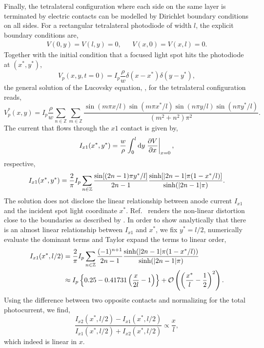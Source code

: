 Finally, the tetralateral configuration where each side on the same layer is terminated by electric contacts can be modelled by Dirichlet boundary conditions on all sides.
For a rectangular tetralateral photodiode of width $l$, the explicit boundary conditions are,
\begin{align}
	V(0, y)=V(l,y)=0, && V(x,0)=V(x,l)=0.
\end{align}
Together with the initial condition that a focused light spot hits the photodiode at $(x^*,y^*)$,
\begin{equation}
	V_p(x,y, t=0)=I_p\frac{\rho}{w}\delta(x-x^*)\delta(y-y^*)
	\label{eq:lucovsky_initial},
\end{equation}
the general solution of the Lucovsky equation, , for the tetralateral configuration reads,
\begin{equation}
	V^*_p(x,y)=I_p\frac{\rho}{w}\sum_{n\in\mathbb{Z}}\sum_{m\in\mathbb{Z}}\frac{\sin(m\pi x/l)\sin(m\pi x^*/l)\sin(n\pi y/l)\sin(n\pi y^*/l)}{(m^2+n^2)\pi^2}
	\label{eq:lucovsky_solution}.
\end{equation}
The current that flows through the $x1$ contact is given by,
\begin{equation}
	I_{x1}(x^*,y^*)=\frac{w}{\rho}\int_0^l\dd{y}\eval{\pdv{V}{x}}_{x=0},
\end{equation}
respective,
\begin{equation}
	I_{x1}(x^*,y^*)=\frac{2}{\pi}I_p\sum_{n\in\mathbb{Z}}\frac{\sin[(2n-1)\pi y^*/l]}{2n-1}\frac{\sinh[\abs{2n-1}\pi(1-x^*/l)]}{\sinh(\abs{2n-1}\pi)}
	\label{eq:lucovsky_current}.
\end{equation}
The solution does not disclose the linear relationship between anode current $I_{x1}$ and the incident spot light coordinate $x^*$.
Ref.~\cite[Fig.~7]{Woltring75} renders the non-linear distortion close to the boundaries as described by .
In order to show analytically that there is an almost linear relationship between $I_{x1}$ and $x^*$, we fix $y^*=l/2$, numerically evaluate the dominant terms and Taylor expand the terms to linear order,
\begin{align}
	I_{x1}(x^*,l/2)
	&=\frac{2}{\pi}I_p\sum_{n\in\mathbb{Z}}\frac{(-1)^{n+1}}{2n-1}\frac{\sinh(\abs{2n-1}\pi(1-x^*/l))}{\sinh(\abs{2n-1}\pi)}\\
	&\approx I_p\left\{0.25-0.41731\left(\frac{x}{2l}-1\right)\right\}+\mathcal{O}\left(\left(\frac{x^*}{l}-\frac{1}{2}\right)^2\right).
\end{align}
Using the difference between two opposite contacts and normalizing for the total photocurrent, we find,
\begin{equation}
	\frac{I_{x2}(x^*,l/2)-I_{x1}(x^*,l/2)}{I_{x1}(x^*,l/2)+I_{x2}(x^*,l/2)}
	\propto\frac{x}{l},
\end{equation}
which indeed is linear in $x$.

